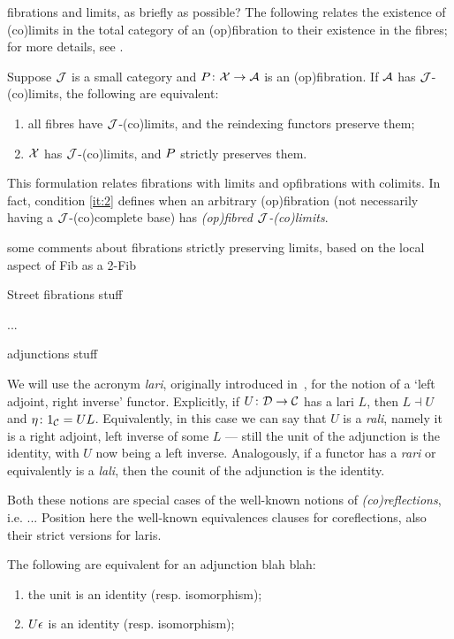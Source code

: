 \documentclass{amsart}
\begin{document}
{\chris fibrations and limits, as briefly as possible?}
The following relates the existence of (co)limits in the total category of an (op)fibration to their existence in the fibres; for more details, see \cite{hermidaphd}.

\begin{lem}\label{lem:fibrewiselimits}
Suppose $\ca{J}$ is a small category and $\P\colon\X\to\A$ is an (op)fibration. If $\A$ has $\ca{J}$-(co)limits,
the following are equivalent:
\begin{enumerate}
 \item all fibres have $\ca{J}$-(co)limits, and the reindexing functors preserve them;
 \item $\X$ has $\ca{J}$-(co)limits, and $\P$ strictly preserves them.\label{it:2}
\end{enumerate}
\end{lem}
This formulation relates fibrations with limits and opfibrations with colimits.
In fact, condition \ref{it:2} defines when an arbitrary (op)fibration (not necessarily having a $\ca{J}$-(co)complete base) has \emph{(op)fibred $\ca{J}$-(co)limits}.

{\chris some comments about fibrations strictly preserving limits, based on the local aspect of Fib as a 2-Fib}
\cite{Fib2Fib}

{\chris Street fibrations stuff}

...

{\chris adjunctions stuff}

We will use the acronym \emph{lari}, originally introduced in~\cite{Grayfibredandcofibred}, for the notion of a `left adjoint, right inverse' functor. Explicitly, if $U\colon\ca{D}\to\ca{C}$ has a lari $L$, then $L\dashv U$ and $\eta\colon1_\ca{C}=UL$. Equivalently, in this case we can say that $U$ is a \emph{rali}, namely it is a right adjoint, left inverse of some $L$ --- still the unit of the adjunction is the identity, with $U$ now being a left inverse. Analogously, if a functor has a \emph{rari} or equivalently is a \emph{lali}, then the counit of the adjunction is the identity.

Both these notions are special cases of the well-known notions of \emph{(co)reflections}, i.e. ...
{\chris Position here the well-known equivalences clauses for coreflections, also their strict versions for laris.}
\begin{prop}\label{prop:coreflection}
 The following are equivalent for an adjunction blah blah:
 \begin{enumerate}
  \item the unit is an identity (resp. isomorphism);
  \item $\U\epsilon$ is an identity (resp. isomorphism);
 \end{enumerate}

\end{prop}
\end{document}
